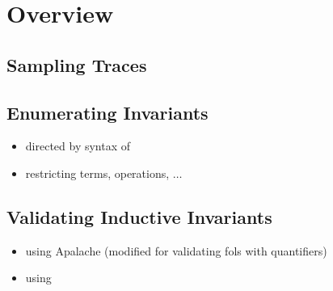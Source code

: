 
\section{Overview}  \label{section:overview}

\subsection{Sampling \tlaplus{} Traces} \label{ss:sampling}

\subsection{Enumerating Invariants} \label{ss:enumerating}

\begin{itemize}
  \item directed by syntax of \tlaplus
  \item restricting terms, operations, $\ldots$
\end{itemize}
\subsection{Validating Inductive Invariants} \label{ss:validating}

\begin{itemize}
  \item using Apalache (modified for validating fols with quantifiers)
  \item using \cite{ProofAutomation:PhDThesis2014}
\end{itemize}
